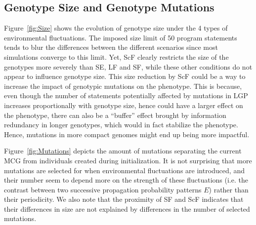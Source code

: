 \subsection{Genotype Size and Genotype Mutations}

Figure~\ref{fig:Size} shows the evolution of genotype size under the 4 types of environmental fluctuations. The imposed size limit of 50 program statements tends to blur the differences between the different scenarios since most simulations converge to this limit. Yet, ScF clearly restricts the size of the genotypes more severely than SE, LF and SF, while these other conditions do not appear to influence genotype size. This size reduction by ScF could be a way to increase the impact of genotypic mutations on the phenotype. This is because, even though the number of statements potentially affected by mutations in LGP increases proportionally with genotype size, hence could have a larger effect on the phenotype, there can also be a ``buffer'' effect brought by information redundancy in longer genotypes, which would in fact stabilize the phenotype. Hence, mutations in more compact genomes might end up being more impactful.

Figure~\ref{fig:Mutations} depicts the amount of mutations separating the current MCG from individuals created during initialization. It is not surprising that more mutations are selected for when environmental fluctuations are introduced, and their number seem to depend more on the strength of these fluctuations (i.e. the contrast between two successive propagation probability patterns $E$) rather than their periodicity. We also note that the proximity of SF and ScF indicates that their differences in size are not explained by differences in the number of selected mutations.

